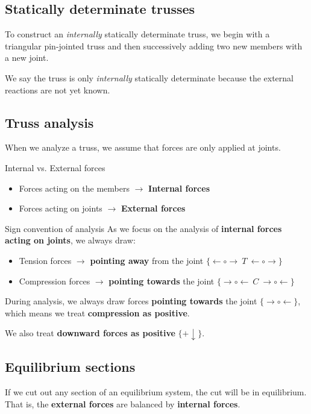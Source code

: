 \subsection{Statically determinate trusses}
To construct an \emph{internally} statically determinate truss, we begin with a triangular pin-jointed truss and then successively adding two new members with a new joint.

We say the truss is only \emph{internally} statically determinate because the external reactions are not yet known.

\subsection{Truss analysis}
When we analyze a truss, we assume that forces are only applied at joints.
\begin{knBox}
    {Internal vs. External forces}
    \begin{itemize}
        \item Forces acting on the members $\to$ \textbf{Internal forces}
        \item Forces acting on joints $\to$ \textbf{External forces}
    \end{itemize}
\end{knBox}
\begin{definition}
    {Sign convention of analysis}
    As we focus on the analysis of \textbf{internal forces acting on joints}, we always draw:
    \begin{itemize}
        \item Tension forces $\to$ \textbf{pointing away} from the joint $\{\leftarrow\circ\boxed{\rightarrow\ T\ \leftarrow}\circ\rightarrow\}$
        \item Compression forces $\to$ \textbf{pointing towards} the joint $\{\rightarrow\circ\boxed{\leftarrow\ C\ \rightarrow}\circ\leftarrow\}$
    \end{itemize}
    During analysis, we always draw forces \textbf{pointing towards} the joint $\{\rightarrow\circ\leftarrow\}$, which means we treat \textbf{compression as positive}.

    We also treat \textbf{downward forces as positive} $\{+\downarrow\}$.
\end{definition}
\subsection{Equilibrium sections}
If we cut out any section of an equilibrium system, the cut will be in equilibrium. That is, the \textbf{external forces} are balanced by \textbf{internal forces}.

